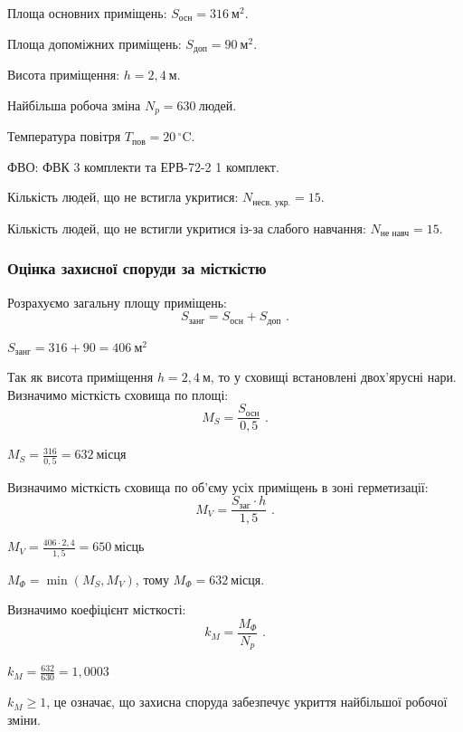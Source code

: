 \documentclass[a4paper,ukrainian,utf8,nocolumnsxix,floatsection,equationsection]{eskdtext}
\renewcommand\paragraph{\subsubsection}
\begin{document}
Площа основних приміщень: $S_{\text{осн}} = 316\:\text{м}^2$.

Площа допоміжних приміщень: $S_{\text{доп}} = 90\:\text{м}^2$.

Висота приміщення: $h = 2,4\:\text{м}$.

Найбільша робоча зміна $N_p = 630\:\text{людей}$.

Температура повітря $T_{\text{пов}} = 20\,^{\circ}\mathrm{C}$.

ФВО: ФВК 3 комплекти та ЕРВ-72-2 1 комплект.

Кількість людей, що не встигла укритися: $N_{\text{несв. укр.}} = 15$.

Кількість людей, що не встигли укритися із-за слабого навчання: $N_{\text{не навч}} = 15$.

\paragraph{Оцінка захисної споруди за місткістю}

Розрахуємо загальну площу приміщень:
\begin{equation}
	S_{\text{занг}} = S_{\text{осн}} + S_{\text{доп}} \text{ .}
\end{equation}

$ S_{\text{занг}} = 316 + 90 = 406\:\text{м}^2$

Так як висота приміщення $h = 2,4\:\text{м}$, то у сховищі встановлені двох’ярусні нари. Визначимо місткість сховища по площі:
\begin{equation}
	M_S = \frac{S_{\text{осн}}}{0,5} \text{ .}
\end{equation}

$M_S = \frac{316}{0,5} = 632\:\text{місця}$


Визначимо місткість сховища по об’єму усіх приміщень в зоні герметизації:
\begin{equation}
	M_V = \frac{S_{\text{заг}} \cdot h}{1,5} \text{ .}
\end{equation}

$M_V = \frac{406 \cdot 2,4}{1,5} = 650\:\text{місць}$

$M_\Phi = \min(M_S, M_V)$, тому $M_\Phi = 632\:\text{місця}$.

Визначимо коефіцієнт місткості:
\begin{equation}
	k_M = \frac{M_\Phi}{N_p} \text{ .}
\end{equation}

$k_M = \frac{632}{630} = 1,0003$

$k_M \geq 1$, це означає, що захисна споруда забезпечує укриття найбільшої робочої зміни.
\end{document}

